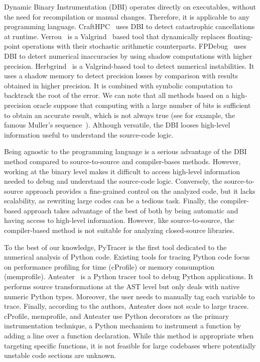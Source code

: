 \documentclass[10pt,journal,compsoc]{IEEEtran}
\newcommand{\pytracer}[0]{PyTracer\xspace}
\DeclareRobustCommand{\add}[1]{#1}
\DeclareRobustCommand{\remove}[1]{}
\begin{document}
Dynamic Binary Instrumentation (DBI) operates directly on executables, without
the need for recompilation or manual changes. Therefore, it is applicable to any
programming language. CraftHPC~\cite{lam2013dynamic} uses DBI to detect
catastrophic cancellations at runtime. Verrou~\cite{fevotte2016verrou} is a
Valgrind~\cite{nethercote2007valgrind} based tool that dynamically replaces
floating-point operations with their stochastic arithmetic counterparts.
FPDebug~\cite{benz2012dynamic} uses DBI to detect numerical inaccuracies by
using shadow computations with higher precision.
Herbgrin\remove{g}\add{d}~\cite{sanchez2017finding} is a Valgrind-based tool to
detect numerical instabilities. It uses a shadow memory to detect precision
losses by comparison with results obtained \remove{at} \add{in} higher
precision. It is combined with symbolic computation to backtrack the root of the
error. We can note that all methods based on a high-precision oracle suppose
that computing with a large number of bits is sufficient to obtain an accurate
result, which is not always true (see for example, the famous Muller's
sequence~\cite{bajard1996introduction}). Although versatile, the DBI looses
high-level information useful to understand the source-code logic.

Being agnostic to the programming language is a serious advantage of the DBI
method compared to source-to-source and compiler-bases methods. However, working
at the binary level makes it difficult to access high-level information needed
to debug and understand the source-code logic. Conversely, the source-to-source
approach provides a fine-grained control on the analyzed code, but it lacks
scalability, as rewriting large codes can be a tedious task. Finally, the
compiler-based approach takes advantage of the best of both by being automatic
and having access to high-level information. However, like source-to-source, the
compiler-based method is not suitable for analyzing closed-source libraries.

To the best of our knowledge, \pytracer is the first tool dedicated to the
numerical analysis of Python code. Existing tools for tracing Python code focus
on performance profiling for time (cProfile) or memory consumption (memprofile).
Anteater~\cite{faust2019anteater} is a Python tracer tool to debug Python
applications. It performs source transformations at the AST level but only deals
with native numeric Python types. Moreover, the user needs to manually tag each
variable to trace. Finally, according to the authors, Anteater does not scale to
large traces. cProfile, memprofile, and Anteater use Python decorators as the
primary instrumentation technique, a Python mechanism to instrument a function
by adding a line over a function declaration. While this method is appropriate
when targeting specific functions, it is not feasible for large codebases where
potentially unstable code sections are unknown.
\end{document}
